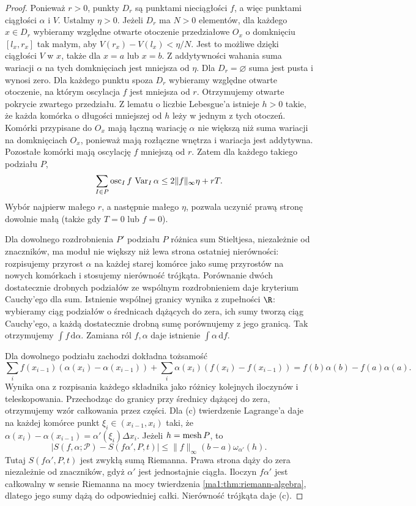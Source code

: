 \begin{proof}
Ponieważ $r>0$, punkty $D_r$ są punktami nieciągłości $f$, a więc punktami ciągłości $\alpha$ i $V$. Ustalmy $\eta>0$. Jeżeli $D_r$ ma $N>0$ elementów,
dla każdego $x\in D_r$ wybieramy względne otwarte
otoczenie przedziałowe $O_x$ o domknięciu $[l_x,r_x]$
tak małym, aby $V(r_x)-V(l_x)<\eta/N$.
Jest to możliwe dzięki ciągłości $V$ w $x$,
także dla $x=a$ lub $x=b$. Z addytywności wahania
suma wariacji $\alpha$ na tych domknięciach
jest mniejsza od $\eta$. Dla $D_r=\varnothing$
suma jest pusta i wynosi zero. Dla każdego punktu spoza $D_r$ wybieramy względne otwarte otoczenie, na którym oscylacja $f$ jest mniejsza od $r$. Otrzymujemy otwarte pokrycie zwartego przedziału. Z lematu o liczbie Lebesgue'a istnieje $h>0$ takie, że każda komórka o długości mniejszej od $h$ leży w jednym z tych otoczeń. Komórki przypisane do $O_x$ mają łączną wariację $\alpha$ nie większą niż suma wariacji na domknięciach $O_x$, ponieważ mają rozłączne wnętrza i wariacja jest addytywna. Pozostałe komórki mają oscylację $f$ mniejszą od $r$. Zatem dla każdego takiego podziału $P$,
\[
 \sum_{I\in P}\operatorname{osc}_I f\,\operatorname{Var}_I\alpha
 \le 2\|f\|_\infty\eta+rT.
\]
Wybór najpierw małego $r$, a następnie małego $\eta$, pozwala uczynić prawą stronę dowolnie małą (także gdy $T=0$ lub $f=0$).

Dla dowolnego rozdrobnienia $P'$ podziału $P$ różnica sum Stieltjesa, niezależnie od znaczników, ma moduł nie większy niż lewa strona ostatniej nierówności: rozpisujemy przyrost $\alpha$ na każdej starej komórce jako sumę przyrostów na nowych komórkach i stosujemy nierówność trójkąta. Porównanie dwóch dostatecznie drobnych podziałów ze wspólnym rozdrobnieniem daje kryterium Cauchy'ego dla sum. Istnienie wspólnej granicy wynika z zupełności $\R$: wybieramy ciąg podziałów o średnicach dążących do zera, ich sumy tworzą ciąg Cauchy'ego, a każdą dostatecznie drobną sumę porównujemy z jego granicą. Tak otrzymujemy $\int f\,\mathrm d\alpha$. Zamiana ról $f,\alpha$ daje istnienie $\int\alpha\,\mathrm df$.

Dla dowolnego podziału zachodzi dokładna tożsamość
\[
 \sum_i f(x_{i-1})(\alpha(x_i)-\alpha(x_{i-1}))
 +\sum_i\alpha(x_i)(f(x_i)-f(x_{i-1}))
 =f(b)\alpha(b)-f(a)\alpha(a).
\]
Wynika ona z rozpisania każdego składnika jako różnicy kolejnych iloczynów i teleskopowania. Przechodząc do granicy przy średnicy dążącej do zera, otrzymujemy wzór całkowania przez części. Dla (c) twierdzenie Lagrange'a daje na każdej komórce punkt $\xi_i\in(x_{i-1},x_i)$ taki, że $\alpha(x_i)-\alpha(x_{i-1})=\alpha'(\xi_i)\Delta x_i$. Jeżeli $h=\operatorname{mesh} P$, to
\[
\left|S(f,\alpha;\mathcal P)-S(f\alpha',P,t)\right|
\le \|f\|_\infty(b-a)\omega_{\alpha'}(h).
\]
Tutaj $S(f\alpha',P,t)$ jest zwykłą sumą Riemanna. Prawa strona dąży do zera niezależnie od znaczników, gdyż $\alpha'$ jest jednostajnie ciągła. Iloczyn $f\alpha'$ jest całkowalny w sensie Riemanna na mocy twierdzenia \ref{ma1:thm:riemann-algebra}, dlatego jego sumy dążą do odpowiedniej całki. Nierówność trójkąta daje (c).


\end{proof}
